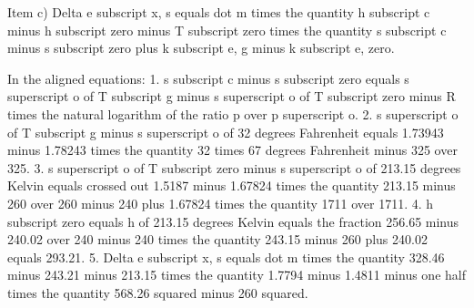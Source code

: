 Item c) Delta e subscript x, s equals dot m times the quantity h subscript c minus h subscript zero minus T subscript zero times the quantity s subscript c minus s subscript zero plus k subscript e, g minus k subscript e, zero.

In the aligned equations:
1. s subscript c minus s subscript zero equals s superscript o of T subscript g minus s superscript o of T subscript zero minus R times the natural logarithm of the ratio p over p superscript o.
2. s superscript o of T subscript g minus s superscript o of 32 degrees Fahrenheit equals 1.73943 minus 1.78243 times the quantity 32 times 67 degrees Fahrenheit minus 325 over 325.
3. s superscript o of T subscript zero minus s superscript o of 213.15 degrees Kelvin equals crossed out 1.5187 minus 1.67824 times the quantity 213.15 minus 260 over 260 minus 240 plus 1.67824 times the quantity 1711 over 1711.
4. h subscript zero equals h of 213.15 degrees Kelvin equals the fraction 256.65 minus 240.02 over 240 minus 240 times the quantity 243.15 minus 260 plus 240.02 equals 293.21.
5. Delta e subscript x, s equals dot m times the quantity 328.46 minus 243.21 minus 213.15 times the quantity 1.7794 minus 1.4811 minus one half times the quantity 568.26 squared minus 260 squared.